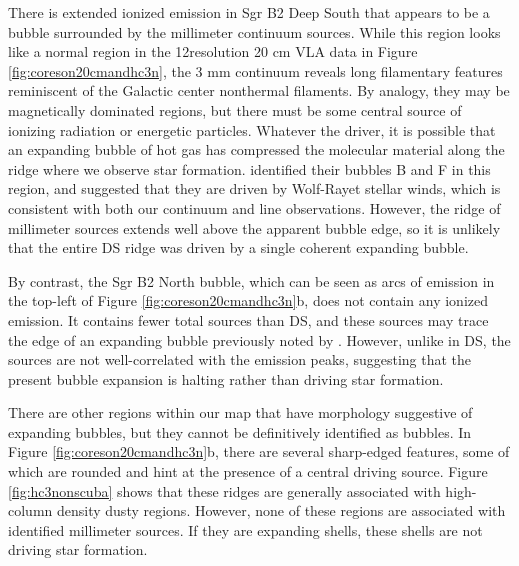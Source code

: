 \documentclass[twocolumn]{aastex61}
\begin{document}

There is extended ionized emission in Sgr B2 Deep South that appears to be a
bubble surrounded by the millimeter continuum sources.  While this region looks
like a normal \hii region in the 12\arcsec resolution 20 cm
VLA data in Figure \ref{fig:coreson20cmandhc3n}, the 3 mm continuum reveals long
filamentary features reminiscent of the Galactic center nonthermal filaments.  By
analogy, they may be magnetically dominated regions, but there must be some
central source of ionizing radiation or energetic particles.  Whatever the
driver, it is possible that an expanding bubble of hot gas has compressed the
molecular material along the ridge where we observe star formation.
\citet{Martin-Pintado1999a} identified their bubbles B and F in this region,
and suggested that they are driven by Wolf-Rayet stellar winds, which is
consistent with both our continuum and line observations.  However, the ridge
of millimeter sources extends well above the apparent bubble edge, so it is
unlikely that the entire DS ridge was driven by a single coherent expanding
bubble.

By contrast, the Sgr B2 North bubble, which can be seen as arcs of
\cyanoacetylene emission in the top-left of Figure
\ref{fig:coreson20cmandhc3n}b, does not contain any ionized emission.  It
contains fewer total sources than DS, and these sources may trace the edge of
an expanding bubble previously noted by \citet{de-Vicente1997a}.  However,
unlike in DS, the sources are not well-correlated with the \cyanoacetylene
emission peaks, suggesting that the present bubble expansion is halting rather
than driving star formation.

There are other regions within our map that have morphology suggestive of
expanding bubbles, but they cannot be definitively identified as bubbles.  In
Figure \ref{fig:coreson20cmandhc3n}b, there are several sharp-edged
\cyanoacetylene features, some of which are rounded and hint at the presence of
a central driving source. Figure \ref{fig:hc3nonscuba} shows that these ridges
are generally associated with high-column density dusty regions.  However, none
of these regions are associated with identified millimeter sources.  If they
are expanding shells, these shells are not driving star formation.
\end{document}
